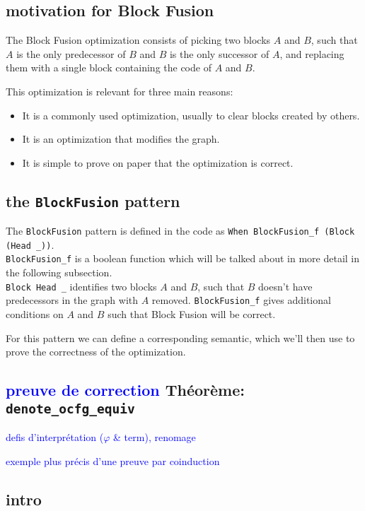 \documentclass[11pt]{article}
\newcommand{\leon}[1]{\textcolor{blue}{#1}}
\begin{document}
\subsection{motivation for Block Fusion}

The Block Fusion optimization consists of picking two blocks $A$ and $B$,
such that $A$ is the only predecessor of $B$ and $B$ is the only successor of $A$,
and replacing them with a single block containing the code of $A$ and $B$.

This optimization is relevant for three main reasons:\begin{itemize}
  \item It is a commonly used optimization, usually to clear blocks created by others.
  \item It is an optimization that modifies the graph.
  \item It is simple to prove on paper that the optimization is correct.
\end{itemize}

\subsection{the \texttt{BlockFusion} pattern}

The \texttt{BlockFusion} pattern is defined in the code as \texttt{When BlockFusion\_f (Block (Head \_))}.\\
\texttt{BlockFusion\_f} is a boolean function which will be talked about in more detail in the following subsection.\\
\texttt{Block Head \_} identifies two blocks $A$ and $B$, such that $B$ doesn't have predecessors in the graph with $A$ removed. \texttt{BlockFusion\_f} gives additional conditions on $A$ and $B$ such that Block Fusion will be correct.

For this pattern we can define a corresponding semantic, which we'll then use to prove the correctness of the optimization.

\subsection{\leon{preuve de correction} Théorème: \texttt{denote\_ocfg\_equiv}}
\label{sec:equiv}

\leon{defis d'interprétation ($\varphi$ \& term), renomage}

\leon{exemple plus précis d'une preuve par coinduction}

\subsection*{intro}
\end{document}

